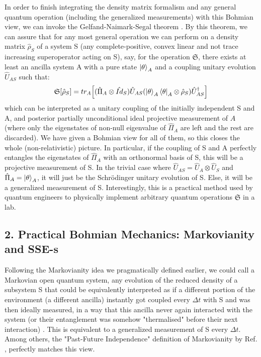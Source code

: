 \documentclass[11pt, a4paper]{article} %
\begin{document}
In order to finish integrating the density matrix formalism and any general quantum operation (including the generalized measurements) with this Bohmian view, we can invoke the Gelfand-Naimark-Segal theorem \cite{GNSTheorem, Generalized}. By this theorem, we can assure that for any most general operation we can perform on a density matrix $\hat{\rho}_S$ of a system S (any complete-positive, convex linear and not trace increasing superoperator acting on S), say, for the operation $\mathfrak{S}$, there exists at least an ancilla system A with a pure state $\ket{\theta}_A$ and a coupling unitary evolution $\hat{U}_{AS}$ such that:\vspace{-0.15cm}
\begin{equation}
\mathfrak{S}[\hat{\rho}_S]=tr_A\qty[ (\hat{\Pi}_A\otimes \hat{Id}_S)  \hat{U}_{AS}\qty(\ket{\theta}_A\bra{\theta}_A\otimes \hat{\rho}_S)\hat{U}_{AS}^\dagger]
\end{equation}
which can be interpreted as a unitary coupling of the initially independent S and A, and posterior partially unconditional ideal projective measurement of $A$ (where only the eigenstates of non-null eigenvalue of $\hat{\Pi}_A$ are left and the rest are discarded). We have given a Bohmian view for all of them, so this closes the whole (non-relativistic) picture. In particular, if the coupling of S and A perfectly entangles the eigenstates of $\hat{\Pi}_A$ with an orthonormal basis of S, this will be a projective measurement of S. In the trivial case where $\hat{U}_{AS}=\hat{U}_A\otimes\hat{U}_S$ and $\hat{\Pi}_A=\ket{\theta}_A$, it will just be the Schrödinger unitary evolution of S. Else, it will be a generalized measurement of S.  Interestingly, this is a practical method used by quantum engineers to physically implement arbitrary quantum operations $\mathfrak{S}$ in a lab.


\subsection*{2. Practical Bohmian Mechanics: Markovianity and SSE-s}
Following the Markovianity idea we pragmatically defined earlier, we could call a Markovian open quantum system, any evolution of the reduced density of a subsystem S that could be equivalently interpreted as if a different portion of the environment (a different ancilla) instantly got coupled every $\Delta t$ with S and was then ideally measured, in a way that this ancilla never again interacted with the system (or their entanglement was somehow "thermalised" before their next interaction) \cite{QuantumTrajs}. This is equivalent to a generalized measurement of S every $\Delta t$. Among others, the "Past-Future Independence" definition of Markovianity by Ref. \cite{MarkovianityDefs}, perfectly matches this view.
\end{document}
